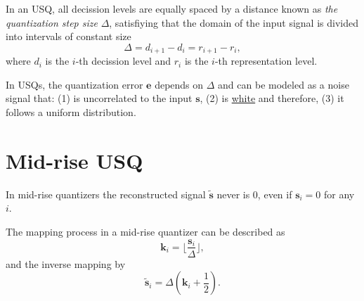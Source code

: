 In an USQ, all decission levels are equally spaced by a distance known
as \emph{the quantization step size} $\Delta$, satisfiying that the
domain of the input signal is divided into intervals of constant size
\begin{equation}
  \Delta=d_{i+1}-d_i=r_{i+1}-r_i,
\end{equation}
where $d_i$ is the $i$-th decission level and $r_i$ is the $i$-th
representation level.

In USQs, the quantization error ${\mathbf e}$ depends on $\Delta$ and
can be modeled as a noise signal that: (1) is uncorrelated to the
input ${\mathbf s}$, (2) is
\href{https://en.wikipedia.org/wiki/White_noise}{white} and therefore,
(3) it follows a uniform distribution.




\section{Mid-rise USQ}

In mid-rise quantizers the reconstructed signal $\tilde{\mathbf s}$
never is 0, even if ${\mathbf s}_i=0$ for any $i$.

The mapping process in a mid-rise quantizer can be described as
\begin{equation}
  {\mathbf k}_i = \lfloor \frac{{\mathbf s}_i}{\Delta} \rfloor,
  \label{eq:mid-rise}
\end{equation}
and the inverse mapping by
\begin{equation}
  \tilde{\mathbf s}_i = \Delta({\mathbf k}_i + \frac{1}{2}).
  \label{eq:inverse_mid-rise}
\end{equation}

